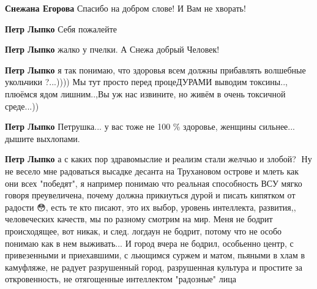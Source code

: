 \begin{itemize}
\begin{itemize}
\textbf{Снежана Егорова}
Спасибо на добром слове! И Вам не хворать!\Laughey[1.0][white]

 
\textbf{Петр Лыпко} Себя пожалейте

 
\textbf{Петр Лыпко} жалко у пчелки.
А Снежа добрый Человек!

 
\textbf{Петр Лыпко} я так понимаю, что здоровья всем должны прибавлять волшебные укольчики ?...)))) Мы тут просто перед процеДУРАМИ выводим токсины.., плюёмся ядом лишним..,Вы уж нас извините, но живём в очень токсичной среде...))

 
\textbf{Петр Лыпко} Петрушка... у вас тоже не 100 \% здоровье, женщины сильнее... дышите выхлопами.

 
\textbf{Петр Лыпко} а с каких пор здравомыслие и реализм стали желчью и злобой?
🤔Ну не весело мне радоваться высадке десанта на Трухановом острове и млеть как
они всех "победят", я например понимаю что реальная способность ВСУ мягко
говоря преувеличена, почему должна прикиуться дурой и писать кипятком от
радости 😳, есть те кто писают, это их выбор, уровень интеллекта, развития,,
человеческих качеств, мы по разному смотрим на мир. Меня не бодрит
происходящее, вот никак, и след. логдаун не бодрит, потому что не особо понимаю
как в нем выживать... И город вчера не бодрил, особьенно центр, с привезенными
и приехавшими, с льющимся суржем и матом, пьяными в хлам в камуфляже, не радует
разрушенный город, разрушенная культура и простите за откровенность, не
отягощенные интеллектом "радозные" лица


\end{itemize}
\end{itemize}

